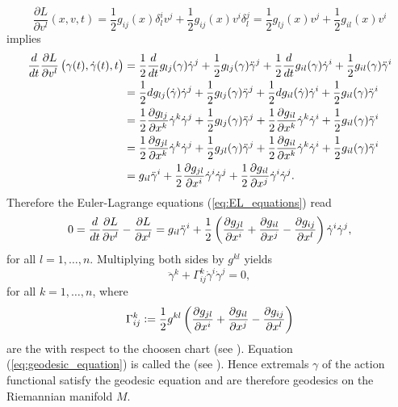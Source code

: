 \begin{example}
	\begin{equation*}
		\frac{\partial L}{\partial v^l}(x,v,t) = \frac{1}{2}g_{ij}(x)\delta^i_lv^j + \frac{1}{2}g_{ij}(x)v^i\delta^j_l = \frac{1}{2}g_{lj}(x)v^j + \frac{1}{2}g_{il}(x)v^i
	\end{equation*}
	\noindent implies
	\begin{align*}
		\frac{d}{dt}\frac{\partial L}{\partial v^l}\del[1]{\gamma(t),\dot{\gamma}(t),t} &= \frac{1}{2}\frac{d}{dt}g_{lj}(\gamma)\dot{\gamma}^j + \frac{1}{2}g_{lj}(\gamma)\ddot{\gamma}^j + \frac{1}{2}\frac{d}{dt}g_{il}(\gamma)\dot{\gamma}^i + \frac{1}{2}g_{il}(\gamma)\ddot{\gamma}^i\\
		&= \frac{1}{2}dg_{lj}(\dot{\gamma})\dot{\gamma}^j + \frac{1}{2}g_{lj}(\gamma)\ddot{\gamma}^j + \frac{1}{2}dg_{il}(\dot{\gamma})\dot{\gamma}^i + \frac{1}{2}g_{il}(\gamma)\ddot{\gamma}^i\\
		&= \frac{1}{2}\frac{\partial g_{lj}}{\partial x^k}\dot{\gamma}^k\dot{\gamma}^j + \frac{1}{2}g_{lj}(\gamma)\ddot{\gamma}^j + \frac{1}{2}\frac{\partial g_{il}}{\partial x^k}\dot{\gamma}^k\dot{\gamma}^i + \frac{1}{2}g_{il}(\gamma)\ddot{\gamma}^i\\
		&= \frac{1}{2}\frac{\partial g_{jl}}{\partial x^k}\dot{\gamma}^k\dot{\gamma}^j + \frac{1}{2}g_{jl}(\gamma)\ddot{\gamma}^j + \frac{1}{2}\frac{\partial g_{il}}{\partial x^k}\dot{\gamma}^k\dot{\gamma}^i + \frac{1}{2}g_{il}(\gamma)\ddot{\gamma}^i\\
		&= g_{il}\ddot{\gamma}^i + \frac{1}{2}\frac{\partial g_{jl}}{\partial x^i}\dot{\gamma}^i\dot{\gamma}^j + \frac{1}{2}\frac{\partial g_{il}}{\partial x^j}\dot{\gamma}^i\dot{\gamma}^j.
	\end{align*}
	Therefore the Euler-Lagrange equations (\ref{eq:EL_equations}) read
	\begin{equation*}
		0 = \frac{d}{dt}\frac{\partial L}{\partial v^l} - \frac{\partial L}{\partial x^l} = g_{il}\ddot{\gamma}^i + \frac{1}{2}\del[3]{\frac{\partial g_{jl}}{\partial x^i} + \frac{\partial g_{il}}{\partial x^j} - \frac{\partial g_{ij}}{\partial x^l}}\dot{\gamma}^i\dot{\gamma}^j,	
	\end{equation*}
	\noindent for all $l = 1,\dots,n$. Multiplying both sides by $g^{kl}$ yields
	\begin{equation}
		\label{eq:geodesic_equation}
		\ddot{\gamma}^k + \Gamma^k_{ij}\dot{\gamma}^i \dot{\gamma}^j = 0,
	\end{equation}
	\noindent for all $k = 1,\dots,n$, where
	\begin{equation*}
		\Gamma^k_{ij} := \frac{1}{2}g^{kl}\del[3]{\frac{\partial g_{jl}}{\partial x^i} + \frac{\partial g_{il}}{\partial x^j} - \frac{\partial g_{ij}}{\partial x^l}}
	\end{equation*}
	\noindent are the  with respect to the choosen chart (see \cite[70]{lee:Riemannian_manifolds:1997}). Equation (\ref{eq:geodesic_equation}) is called the  (see \cite[58]{lee:Riemannian_manifolds:1997}). Hence extremals $\gamma$ of the action functional satisfy the geodesic equation and are therefore geodesics on the Riemannian manifold $M$.
\end{example}

